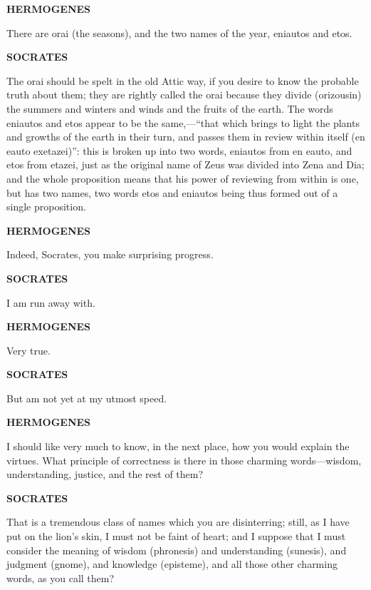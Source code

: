 \documentclass[11pt,letter]{article}
\begin{document}
\par \textbf{HERMOGENES}
\par   There are orai (the seasons), and the two names of the year, eniautos and etos.

\par \textbf{SOCRATES}
\par   The orai should be spelt in the old Attic way, if you desire to know the probable truth about them; they are rightly called the orai because they divide (orizousin) the summers and winters and winds and the fruits of the earth. The words eniautos and etos appear to be the same,—“that which brings to light the plants and growths of the earth in their turn, and passes them in review within itself (en eauto exetazei)”:  this is broken up into two words, eniautos from en eauto, and etos from etazei, just as the original name of Zeus was divided into Zena and Dia; and the whole proposition means that his power of reviewing from within is one, but has two names, two words etos and eniautos being thus formed out of a single proposition.

\par \textbf{HERMOGENES}
\par   Indeed, Socrates, you make surprising progress.

\par \textbf{SOCRATES}
\par   I am run away with.

\par \textbf{HERMOGENES}
\par   Very true.

\par \textbf{SOCRATES}
\par   But am not yet at my utmost speed.

\par \textbf{HERMOGENES}
\par   I should like very much to know, in the next place, how you would explain the virtues. What principle of correctness is there in those charming words—wisdom, understanding, justice, and the rest of them?

\par \textbf{SOCRATES}
\par   That is a tremendous class of names which you are disinterring; still, as I have put on the lion’s skin, I must not be faint of heart; and I suppose that I must consider the meaning of wisdom (phronesis) and understanding (sunesis), and judgment (gnome), and knowledge (episteme), and all those other charming words, as you call them?
\end{document}

